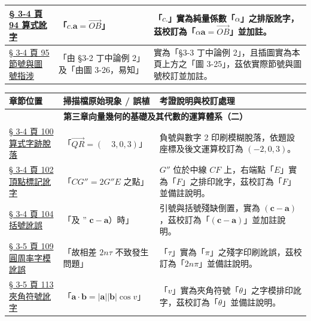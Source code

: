 \documentclass[a4paper,12pt,twoside]{article}
\begin{document}
\begin{table}[H]
\begin{tabularx}{\textwidth}{|p{3.0cm}|p{3.8cm}|X|}
\hyperref[note:b3s-ch3-p94-alpha-c-typo]{§ 3-4 頁 94 算式訛字} & 
「$c.\mathbf{a} = \vec{OB}$」 & 
「$c.$」實為純量係數「$\alpha$」之排版訛字，茲校訂為「$\alpha\mathbf{a} = \vec{OB}$」並加註。 \\ \hline

\hyperref[note:b3s-ch3-p95-ex2-ref]{§ 3-4 頁 95 節號與圖號指涉} & 
「由 §3-2 丁中論例 2」及「由圖 3-26，易知」 & 
實為「§3-3 丁中論例 2」，且插圖實為本頁上方之「圖 3-25」，茲依實際節號與圖號校訂並加註。 \\ \hline

\end{tabularx}
\end{table}

\begin{table}[H]
\centering
\small
\renewcommand{\arraystretch}{1.35}
\begin{tabularx}{\textwidth}{|p{3.0cm}|p{3.8cm}|X|}
\hline
\textbf{章節位置} & \textbf{掃描檔原始現象 / 誤植} & \textbf{考證說明與校訂處理} \\ \hline

\multicolumn{3}{|c|}{\textbf{第三章\quad 向量幾何的基礎及其代數的運算體系（二）}} \\ \hline

\hyperref[note:b3s-ch3-p100-qr-typo]{§ 3-4 頁 100 算式字跡脫落} & 
「$\vec{QR} = (\quad 3, 0, 3)$」 & 
負號與數字 2 印刷模糊脫落，依題設座標及後文運算校訂為 $(-2, 0, 3)$。 \\ \hline

\hyperref[note:b3s-ch3-p102-ge-typo]{§ 3-4 頁 102 頂點標記訛字} & 
「$CG'' = 2G''E$ 之點」 & 
$G''$ 位於中線 $CF$ 上，右端點「$E$」實為「$F$」之排印訛字，茲校訂為「$F$」並備註說明。 \\ \hline

\hyperref[note:b3s-ch3-p104-prob7-typo]{§ 3-4 頁 104 括號訛誤} & 
「及 $\text{'' }\mathbf{c}-\mathbf{a}$）時」 & 
引號與括號殘缺倒置，實為 $(\mathbf{c}-\mathbf{a})$，茲校訂為「$(\mathbf{c}-\mathbf{a})$」並加註說明。 \\ \hline

\hyperref[note:b3s-ch3-p109-tau-typo]{§ 3-5 頁 109 圓周率字模訛誤} & 
「故相差 $2n\tau$ 不致發生問題」 & 
「$\tau$」實為「$\pi$」之殘字印刷訛誤，茲校訂為「$2n\pi$」並備註說明。 \\ \hline

\hyperref[note:b3s-ch3-p113-cos-theta-typo]{§ 3-5 頁 113 夾角符號訛字} & 
「$\mathbf{a}\cdot\mathbf{b} = |\mathbf{a}||\mathbf{b}|\cos v$」 & 
「$v$」實為夾角符號「$\theta$」之字模排印訛字，茲校訂為「$\theta$」並備註說明。 \\ \hline


\end{tabularx}
\end{table}
\end{document}
